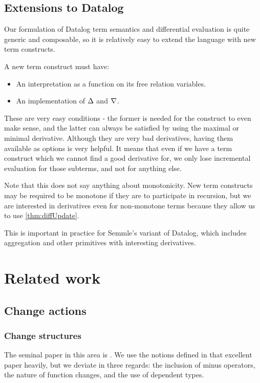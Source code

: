 \subsection{Extensions to Datalog}

Our formulation of Datalog term semantics and differential evaluation is quite
generic and composable, so it is relatively easy to extend the language with new
term constructs.

A new term construct must have:
\begin{itemize}
  \item An interpretation as a function on its free relation variables.
  \item An implementation of $\Delta$ and $\nabla$.
\end{itemize}

These are very easy conditions - the former is needed for the construct to even
make sense, and the latter can always be satisfied by using the maximal or
minimal derivative. Although they are very bad derivatives, having them
available as options is very helpful. It means that even if we have a term
construct which we cannot find a good derivative for, we only lose incremental
evaluation for those subterms, and not for anything else.

Note that this does not say anything about monotonicity. New term constructs may
be required to be monotone if they are to participate in recursion, but we are
interested in derivatives even for non-monotone terms because they allow us to
use \cref{thm:diffUpdate}.

This is important in practice for Semmle's variant of Datalog, which includes
aggregation and other primitives with interesting derivatives.

\section{Related work}

\subsection{Change actions}

\subsubsection{Change structures}

The seminal paper in this area is \textcite{cai2014changes}. We use the notions
defined in that excellent paper heavily, but we deviate in three regards: the
inclusion of minus operators, the nature of function changes, and the use of
dependent types.

